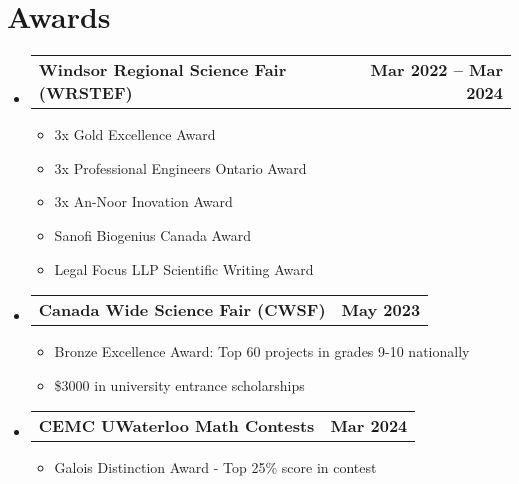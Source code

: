\documentclass[letterpaper,11pt]{article}
\makeatletter
\newcommand{\resumeItem}[1]{
  \item\small{
    {#1 \vspace{-2pt}}
  }
}
\newcommand{\resumeProjectHeading}[2]{
    \item
    \begin{tabular*}{0.97\textwidth}{l@{\extracolsep{\fill}}r}
      \small#1 & #2 \\
    \end{tabular*}\vspace{-7pt}
}
\newcommand{\resumeSubHeadingListStart}{\begin{itemize}[leftmargin=0.15in, label={}]}
\newcommand{\resumeSubHeadingListEnd}{\end{itemize}}
\newcommand{\resumeItemListStart}{\begin{itemize}}
\newcommand{\resumeItemListEnd}{\end{itemize}\vspace{-5pt}}
\makeatother
\begin{document}
\section{Awards}
    \resumeSubHeadingListStart
      \resumeProjectHeading
          {\textbf{Windsor Regional Science Fair (WRSTEF)} }{\textbf {Mar 2022 -- Mar 2024}}
          \resumeItemListStart           
            \resumeItem{3x Gold Excellence Award}            
            \resumeItem{3x Professional Engineers Ontario Award}
            \resumeItem{3x An-Noor Inovation Award}
            \resumeItem{Sanofi Biogenius Canada Award}
            \resumeItem{Legal Focus LLP Scientific Writing Award}
          \resumeItemListEnd
          
      \resumeProjectHeading
          {\textbf{Canada Wide Science Fair (CWSF)}} {\textbf {May 2023}}
          \resumeItemListStart
            \resumeItem{Bronze Excellence Award: Top 60 projects in grades 9-10 nationally}
            \resumeItem{\$3000 in university entrance scholarships}
          \resumeItemListEnd

      \resumeProjectHeading
          {\textbf{CEMC UWaterloo Math Contests} }{\textbf {Mar 2024}}
          \resumeItemListStart          
            \resumeItem{Galois Distinction Award - Top 25\% score in contest}
          \resumeItemListEnd
    \resumeSubHeadingListEnd









\end{document}
